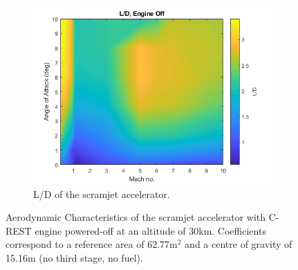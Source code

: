 \begin{figure}[ht]
\begin{subfigure}{.5\textwidth}
		\centering
		\includegraphics[width=0.99\linewidth]{figures/3_vehicle_design/LD}
		\caption{L/D of the scramjet accelerator.}
		\label{fig:LD}
	\end{subfigure}
	\caption{Aerodynamic Characteristics of the scramjet accelerator with C-REST engine powered-off at an altitude of 30km. Coefficients correspond to a reference area of 62.77m$^2$ and a centre of gravity of 15.16m (no third stage, no fuel).} %
	\label{fig:aero1}
\end{figure}

